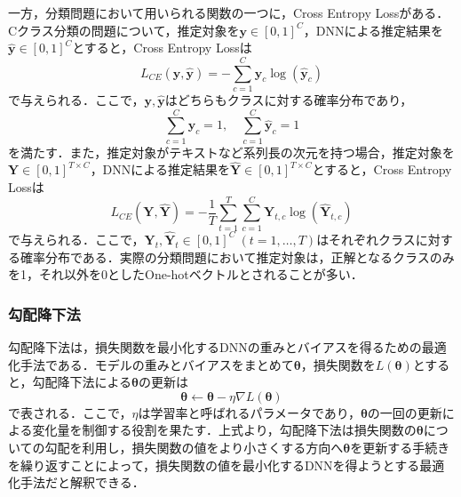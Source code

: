 \documentclass[12pt]{jarticle}
\numberwithin{equation}{section}    %
\numberwithin{figure}{section}      %
\numberwithin{table}{section}      %
\begin{document}
一方，分類問題において用いられる関数の一つに，Cross Entropy Lossがある．Cクラス分類の問題について，推定対象を$\bm{y} \in [0, 1]^{C}$，DNNによる推定結果を$\hat{\bm{y}} \in [0, 1]^{C}$とすると，Cross Entropy Lossは
\begin{equation}
    L_{CE}(\bm{y}, \hat{\bm{y}}) = - \sum_{c = 1}^{C} \bm{y}_{c}\log(\hat{\bm{y}}_{c})
\end{equation}
で与えられる．ここで，$\bm{y}, \hat{\bm{y}}$はどちらもクラスに対する確率分布であり，
\begin{equation}
    \sum_{c = 1}^{C} \bm{y}_{c} = 1, \quad \sum_{c = 1}^{C} \hat{\bm{y}}_{c} = 1
\end{equation}
を満たす．また，推定対象がテキストなど系列長の次元を持つ場合，推定対象を$\bm{Y} \in [0, 1]^{T \times C}$，DNNによる推定結果を$\hat{\bm{Y}} \in [0, 1]^{T \times C}$とすると，Cross Entropy Lossは
\begin{equation}
    L_{CE}(\bm{Y}, \hat{\bm{Y}}) = - \frac{1}{T} \sum_{t = 1}^{T} \sum_{c = 1}^{C} \bm{Y}_{t, c}\log(\hat{\bm{Y}}_{t, c})
\end{equation}
で与えられる．ここで，$\bm{Y}_{t}, \hat{\bm{Y}}_{t} \in [0, 1]^{C} ~ (t = 1, \ldots, T)$はそれぞれクラスに対する確率分布である．実際の分類問題において推定対象は，正解となるクラスのみを1，それ以外を0としたOne-hotベクトルとされることが多い．

\subsubsection{勾配降下法}
\label{sec3:sec:gradient_descent}
勾配降下法は，損失関数を最小化するDNNの重みとバイアスを得るための最適化手法である．モデルの重みとバイアスをまとめて$\bm{\theta}$，損失関数を$L(\bm{\theta})$とすると，勾配降下法による$\bm{\theta}$の更新は
\begin{equation}
    \bm{\theta} \leftarrow \bm{\theta} - \eta \nabla L(\bm{\theta})
\end{equation}
で表される．ここで，$\eta$は学習率と呼ばれるパラメータであり，$\bm{\theta}$の一回の更新による変化量を制御する役割を果たす．上式より，勾配降下法は損失関数の$\bm{\theta}$についての勾配を利用し，損失関数の値をより小さくする方向へ$\bm{\theta}$を更新する手続きを繰り返すことによって，損失関数の値を最小化するDNNを得ようとする最適化手法だと解釈できる．
\end{document}
